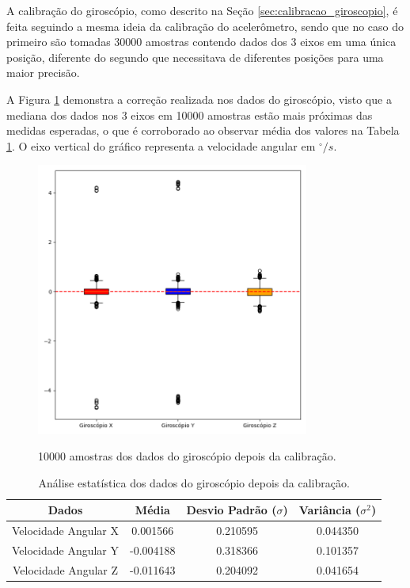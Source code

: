 \documentclass[acronym, symbols, table, deposito]{fei}
\begin{document}
	A calibração do giroscópio, como descrito na Seção \ref{sec:calibracao_giroscopio}, é feita seguindo a mesma ideia da calibração do acelerômetro, sendo que no caso do primeiro são tomadas 30000 amostras contendo dados dos 3 eixos em uma única posição, diferente do segundo que necessitava de diferentes posições para uma maior precisão.
	
	A Figura \ref{fig:dados_giroscopio_certo} demonstra a correção realizada nos dados do giroscópio, visto que a mediana dos dados nos 3 eixos em 10000 amostras estão mais próximas das medidas esperadas, o que é corroborado ao observar média dos valores na Tabela \ref{tab:giroscopio_depois_calibracao}. O eixo vertical do gráfico representa a velocidade angular em $^\circ/s$.
	
	\begin{figure}[!htb]
		\centering
		\caption{10000 amostras dos dados do giroscópio depois da calibração.}
		\includegraphics[width=0.8\textwidth]{dados_giroscopio_certos.png}
		\label{fig:dados_giroscopio_certo}
	\end{figure}
	
	\begin{table}[!htb]
		\centering
		\caption{Análise estatística dos dados do giroscópio depois da calibração.}\label{tab:giroscopio_depois_calibracao}
		\begin{tabular}{|c|c|c|c|}
			\hline
			Dados & Média & Desvio Padrão ($\sigma$) & Variância ($\sigma^2$) \\ \hline
			\small Velocidade Angular X & 0.001566  & 0.210595 & 0.044350 \\ \hline
			\small Velocidade Angular Y & -0.004188  & 0.318366 & 0.101357 \\ \hline
			\small Velocidade Angular Z & -0.011643 & 0.204092 & 0.041654 \\ \hline	
		\end{tabular}
	\end{table}
	
\end{document}
